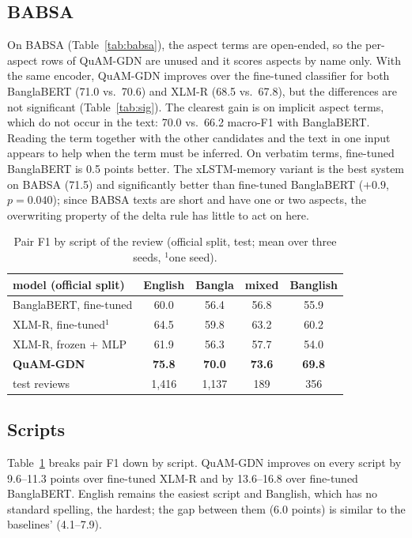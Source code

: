 \documentclass[11pt]{article}
\newcommand{\quam}{QuAM-GDN}
\begin{document}
\subsection{BABSA}
On BABSA (Table~\ref{tab:babsa}), the aspect terms are open-ended, so the per-aspect rows of \quam{}
are unused and it scores aspects by name only. With the same encoder, \quam{} improves over the
fine-tuned classifier for both BanglaBERT (71.0 vs.\ 70.6) and XLM-R (68.5 vs.\ 67.8), but the
differences are not significant (Table~\ref{tab:sig}). The clearest gain is on implicit aspect terms,
which do not occur in the text: 70.0 vs.\ 66.2 macro-F1 with BanglaBERT. Reading the term together
with the other candidates and the text in one input appears to help when the term must be inferred.
On verbatim terms, fine-tuned BanglaBERT is 0.5 points better. The xLSTM-memory variant is the best
system on BABSA (71.5) and significantly better than fine-tuned BanglaBERT ($+0.9$, $p=0.040$); since
BABSA texts are short and have one or two aspects, the overwriting property of the delta rule has
little to act on here.

\begin{table}[t]
\centering\small
\begin{tabular}{lcccc}
\toprule
model (official split) & English & Bangla & mixed & Banglish \\
\midrule
BanglaBERT, fine-tuned & 60.0 & 56.4 & 56.8 & 55.9 \\
XLM-R, fine-tuned$^1$ & 64.5 & 59.8 & 63.2 & 60.2 \\
XLM-R, frozen + MLP & 61.9 & 56.3 & 57.7 & 54.0 \\
\textbf{\quam{}} & \textbf{75.8} & \textbf{70.0} & \textbf{73.6} & \textbf{69.8} \\
\midrule
test reviews & 1,416 & 1,137 & 189 & 356 \\
\bottomrule
\end{tabular}
\caption{Pair F1 by script of the review (official split, test; mean over three seeds, $^1$one seed).}
\label{tab:script}
\end{table}

\subsection{Scripts}
Table~\ref{tab:script} breaks pair F1 down by script. \quam{} improves on every script by 9.6--11.3
points over fine-tuned XLM-R and by 13.6--16.8 over fine-tuned BanglaBERT. English remains the easiest
script and Banglish, which has no standard spelling, the hardest; the gap between them (6.0 points) is
similar to the baselines' (4.1--7.9).
\end{document}
